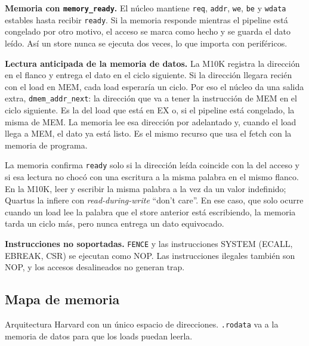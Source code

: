 \documentclass[11pt,a4paper]{article}
\newcommand{\code}[1]{\texttt{#1}}
\begin{document}
\textbf{Memoria con \code{memory\_ready}.} El núcleo mantiene \code{req}, \code{addr}, \code{we}, \code{be} y \code{wdata} estables hasta recibir \code{ready}. Si la memoria responde mientras el pipeline está congelado por otro motivo, el acceso se marca como hecho y se guarda el dato leído. Así un store nunca se ejecuta dos veces, lo que importa con periféricos.

\textbf{Lectura anticipada de la memoria de datos.} La M10K registra la dirección en el flanco y entrega el dato en el ciclo siguiente. Si la dirección llegara recién con el load en MEM, cada load esperaría un ciclo. Por eso el núcleo da una salida extra, \code{dmem\_addr\_next}: la dirección que va a tener la instrucción de MEM en el ciclo siguiente. Es la del load que está en EX o, si el pipeline está congelado, la misma de MEM. La memoria lee esa dirección por adelantado y, cuando el load llega a MEM, el dato ya está listo. Es el mismo recurso que usa el fetch con la memoria de programa.

La memoria confirma \code{ready} solo si la dirección leída coincide con la del acceso y si esa lectura no chocó con una escritura a la misma palabra en el mismo flanco. En la M10K, leer y escribir la misma palabra a la vez da un valor indefinido; Quartus la infiere con \emph{read-during-write} ``don't care''. En ese caso, que solo ocurre cuando un load lee la palabra que el store anterior está escribiendo, la memoria tarda un ciclo más, pero nunca entrega un dato equivocado.

\textbf{Instrucciones no soportadas.} \code{FENCE} y las instrucciones SYSTEM (ECALL, EBREAK, CSR) se ejecutan como NOP. Las instrucciones ilegales también son NOP, y los accesos desalineados no generan trap.

\subsection{Mapa de memoria}

Arquitectura Harvard con un único espacio de direcciones. \code{.rodata} va a la memoria de datos para que los loads puedan leerla.
\end{document}
